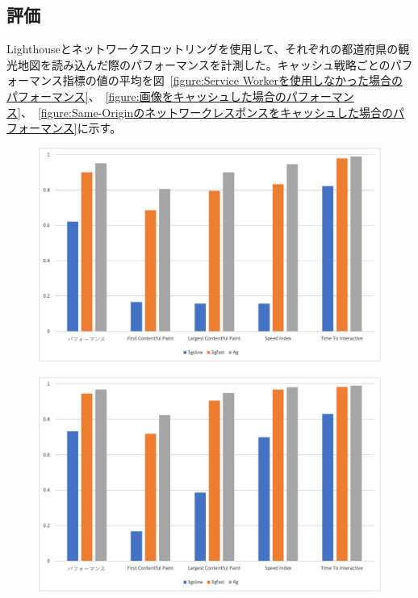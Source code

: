 \begin{multicols*}{2}
\section{評価}
Lighthouseとネットワークスロットリングを使用して、それぞれの都道府県の観光地図を読み込んだ際のパフォーマンスを計測した。キャッシュ戦略ごとのパフォーマンス指標の値の平均を図~\ref{figure:Service Workerを使用しなかった場合のパフォーマンス}、~\ref{figure:画像をキャッシュした場合のパフォーマンス}、~\ref{figure:Same-Originのネットワークレスポンスをキャッシュした場合のパフォーマンス}に示す。
\begin{figure}
  \centering
  \includegraphics[width=\textwidth]{images/without_service_worker.png}
\end{figure}
\begin{figure}
  \centering
  \includegraphics[width=\textwidth]{images/service_worker_cache_images.png}

\end{figure}
\end{multicols*}
